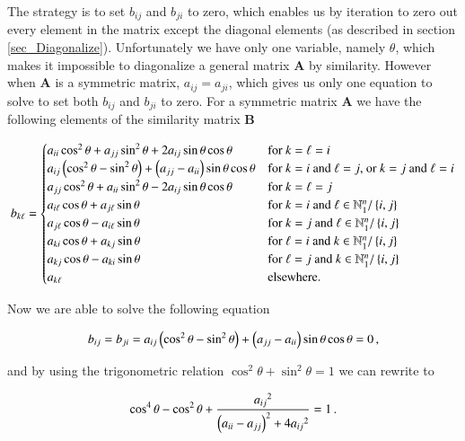 \documentclass[11pt,english,a4paper]{article}
\begin{document}
\begin{flushleft}
The strategy is to set $b_{ij}$ and $b_{ji}$ to zero, which enables us by iteration to zero out every element in the matrix except the diagonal elements (as described in section \ref{sec_Diagonalize}). Unfortunately we have only one variable, namely $\theta$, which makes it impossible to diagonalize a general matrix $\mathbf{A}$ by similarity. However when $\mathbf{A}$ is a symmetric matrix, $a_{ij}=a_{ji}$, which gives us only one equation to solve to set both $b_{ij}$ and $b_{ji}$ to zero. For a symmetric matrix $\mathbf{A}$ we have the following elements of the similarity matrix $\mathbf{B}$

\begin{align}
b_{k\ell} = \begin{cases} a_{ii} \cos^2\theta  + a_{jj}\sin^2 \theta + 2 a_{ij}\sin\theta\cos\theta & \text{for $k=\ell=i$} \\ a_{ij}\left({\cos^2\theta - \sin^2\theta}\right) + \left({a_{jj}-a_{ii}}\right)\sin\theta\cos\theta & \text{for $k=i$ and $\ell = j$, or $k=j$ and $\ell = i$} \\ a_{jj} \cos^2\theta  + a_{ii}\sin^2 \theta - 2 a_{ij}\sin\theta\cos\theta & \text{for $k=\ell=j$} \\ a_{i \ell} \cos\theta +  a_{j\ell} \sin\theta & \text{for $k=i$ and $\ell\in\mathbb{N}_1^n / \left\lbrace{i,j}\right\rbrace$} \\ a_{j\ell} \cos\theta - a_{i\ell}\sin\theta & \text{for $k=j$ and $\ell\in\mathbb{N}_1^n / \left\lbrace{i,j}\right\rbrace$} \\ a_{ki} \cos\theta + a_{kj}\sin\theta & \text{for $\ell=i$ and $k\in\mathbb{N}_1^n / \left\lbrace{i,j}\right\rbrace$} \\ a_{kj}\cos\theta - a_{ki}\sin\theta & \text{for $\ell=j$ and $k\in\mathbb{N}_1^n / \left\lbrace{i,j}\right\rbrace$} \\ a_{k\ell} & \text{elsewhere.}\end{cases}
\label{eq_7}
\end{align}

Now we are able to solve the following equation

\begin{align*}
b_{ij}=b_{ji} = a_{ij}\left({\cos^2\theta - \sin^2\theta}\right)+\left({a_{jj}-a_{ii}}\right)\sin\theta\cos\theta = 0 \,,
\end{align*}

and by using the trigonometric relation $\cos^2\theta+\sin^2\theta = 1$ we can rewrite to

\begin{align*}
\cos^4\theta -\cos^2\theta + \frac{{a_{ij}}^2}{\left({a_{ii}-a_{jj}}\right)^2 + 4 {a_{ij}}^2} = 1\,.
\end{align*}


\end{flushleft}
\end{document}

